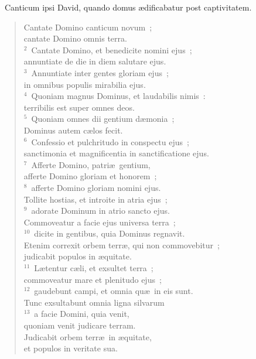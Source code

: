~\lettrine[lines=10,image=true,loversize=0.05,lraise=-0.03]{C}{}anticum ipsi David, quando domus \ae dificabatur post captivitatem. \begin{flushleft}\begin{verse}\vspace{6pt}Cantate Domino canticum novum~;\\ cantate Domino omnis terra.\\
${}^{2}$~Cantate Domino, et benedicite nomini ejus~;\\ annuntiate de die in diem salutare ejus.\\
${}^{3}$~Annuntiate inter gentes gloriam ejus~;\\ in omnibus populis mirabilia ejus.\\
${}^{4}$~Quoniam magnus Dominus, et laudabilis nimis~:\\ terribilis est super omnes deos.\\
${}^{5}$~Quoniam omnes dii gentium d\ae monia~;\\ Dominus autem c\ae los fecit.\\
${}^{6}$~Confessio et pulchritudo in conspectu ejus~;\\ sanctimonia et magnificentia in sanctificatione ejus.\\
${}^{7}$~Afferte Domino, patri\ae\ gentium,\\ afferte Domino gloriam et honorem~;\\
${}^{8}$~afferte Domino gloriam nomini ejus.\\ Tollite hostias, et introite in atria ejus~;\\
${}^{9}$~adorate Dominum in atrio sancto ejus.\\ Commoveatur a facie ejus universa terra~;\\
${}^{10}$~dicite in gentibus, quia Dominus regnavit.\\ Etenim correxit orbem terr\ae , qui non commovebitur~;\\ judicabit populos in \ae quitate.\\
${}^{11}$~L\ae tentur c\ae li, et exsultet terra~;\\ commoveatur mare et plenitudo ejus~;\\
${}^{12}$~gaudebunt campi, et omnia qu\ae\ in eis sunt.\\ Tunc exsultabunt omnia ligna silvarum\\
${}^{13}$~a facie Domini, quia venit,\\ quoniam venit judicare terram.\\ Judicabit orbem terr\ae\ in \ae quitate,\\ et populos in veritate sua.\end{verse}\end{flushleft}


